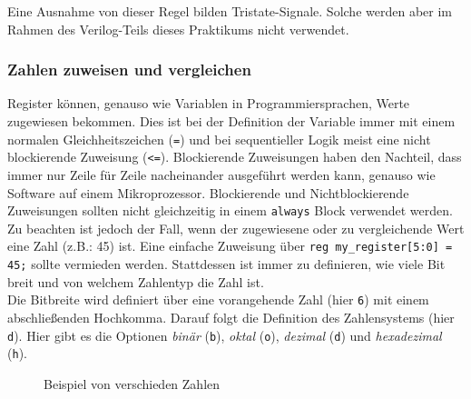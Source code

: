 \begin{center}
	\noindent {}
\end{center}

Eine Ausnahme von dieser Regel bilden Tristate-Signale. Solche
werden aber im Rahmen des Verilog-Teils dieses Praktikums nicht
verwendet.

\subsubsection*{Zahlen zuweisen und vergleichen}
Register können, genauso wie Variablen in Programmiersprachen, Werte zugewiesen bekommen. Dies ist bei der Definition der Variable immer mit einem normalen Gleichheitszeichen (\texttt{=}) und bei sequentieller Logik meist eine nicht blockierende Zuweisung (\texttt{<=}). Blockierende Zuweisungen haben den Nachteil, dass immer nur Zeile für Zeile nacheinander ausgeführt werden kann, genauso wie Software auf einem Mikroprozessor. Blockierende und Nichtblockierende Zuweisungen sollten nicht gleichzeitig in einem \texttt{always} Block verwendet werden.\\
Zu beachten ist jedoch der Fall, wenn der zugewiesene oder zu vergleichende Wert eine Zahl (z.B.: 45) ist. Eine einfache Zuweisung über \texttt{reg my\_register[5:0] = 45;} sollte vermieden werden. Stattdessen ist immer zu definieren, wie viele Bit breit und von welchem Zahlentyp die Zahl ist. \\
Die Bitbreite wird definiert über eine vorangehende Zahl (hier \texttt{6}) mit einem abschließenden Hochkomma. Darauf folgt die Definition des Zahlensystems (hier \texttt{d}). Hier gibt es die Optionen \textit{binär} (\texttt{b}), \textit{oktal} (\texttt{o}), \textit{dezimal} (\texttt{d}) und \textit{hexadezimal} (\texttt{h}).\\

\begin{figure}[h]
	\lstset{style=verilog-style}
	
	\caption{Beispiel von verschieden Zahlen}
	\label{numbers}
\end{figure}

